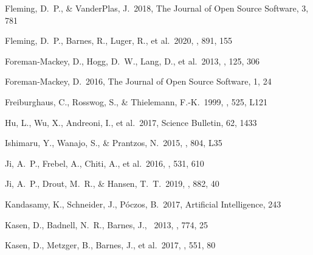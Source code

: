\documentclass[twocolumn]{aastex63}
\begin{document}
\begin{thebibliography}{}
 Fleming, D.~P., \& VanderPlas, J.\ 2018, The Journal of Open Source Software, 3, 781

 Fleming, D.~P., Barnes, R., Luger, R., et al.\ 2020, \apj, 891, 155

 Foreman-Mackey, D., Hogg, D.~W., Lang, D., et al.\ 2013, \pasp, 125, 306

 Foreman-Mackey, D.\ 2016, The Journal of Open Source Software, 1, 24




 Freiburghaus, C., Rosswog, S., \& Thielemann, F.-K.\ 1999, \apjl, 525, L121

 Hu, L., Wu, X., Andreoni, I., et al.\ 2017, Science Bulletin, 62, 1433

 Ishimaru, Y., Wanajo, S., \& Prantzos, N.\ 2015, \apjl, 804, L35

 Ji, A.~P., Frebel, A., Chiti, A., et al.\ 2016, \nat, 531, 610

 Ji, A.~P., Drout, M.~R., \& Hansen, T.~T.\ 2019, \apj, 882, 40


 Kandasamy, K., Schneider, J., P{\'o}czos, B.\ 2017, Artificial Intelligence, 243

Kasen, D., Badnell, N.~R., Barnes, J., \ 2013, \aj, 774, 25

 Kasen, D., Metzger, B., Barnes, J., et al.\ 2017, \nat, 551, 80



\end{thebibliography}
\end{document}
